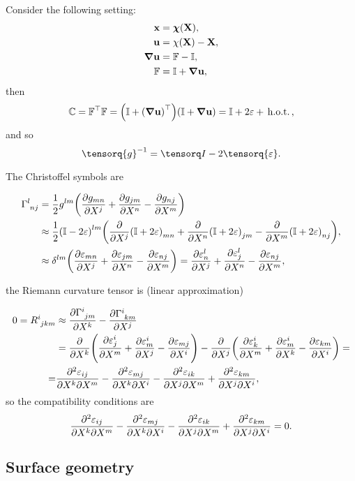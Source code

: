 \documentclass[reqno, a4paper]{article}
\begin{document}
Consider the following setting:
\begin{align*}
	\vb{x}&=\vb*{\chi}\qty(\vb{X}),\\
	\vb{u}&= \vb{\chi}\qty(\vb{X})-\vb{X},\\
	\grad \vb{u} &= \mathbb{F} - \mathbb{I}, \\
	\mathbb{F} &= \mathbb{I} + \grad \vb{u},\\
\end{align*}
then
\[
	\mathbb{C} = \mathbb{F}^\top\mathbb{F}=\qty(\mathbb{I}+\qty(\grad \vb{u})^\top)\qty(\mathbb{I}+\grad \vb{u}) = \mathbb{I} + 2 \mathbb{\varepsilon} + \, \text{h.o.t.} \,,
\]
and so
\[
	\inverse{\tensorq{g}} = \identity - 2 \tensorq{\varepsilon}.
\]

The Christoffel symbols are

\begin{align*}
	\Gamma \indices{^l_{nj}}&= \frac{1}{2}g^{lm}\qty(\pdv{g_{mn}}{X^j}+\pdv{g_{jm}}{X^n}-\pdv{g_{nj}}{X^m}) \\
				&\approx \frac{1}{2}\qty(\identity-2 \tensorq{\varepsilon})^{lm}\qty(\pdv{X^j}\qty(\identity+2 \tensorq{\varepsilon})_{mn}+\pdv{X^n}\qty(\identity+2 \varepsilon)_{jm}-\pdv{X^m}\qty(\identity+2 \varepsilon)_{nj}), \\
				&\approx \delta^{lm}\qty(\pdv{\varepsilon_{mn}}{X^j}+\pdv{\varepsilon_{jm}}{X^n}-\pdv{\varepsilon_{nj}}{X^m}) = \pdv{\varepsilon_{n}^l}{X^j}+\pdv{\varepsilon_{j}^l}{X^n}-\pdv{\varepsilon_{nj}}{X^m},
\end{align*}

the Riemann curvature tensor is (linear approximation)

\begin{align*}
0 = R \indices{^i_{jkm}}& \approx \pdv{\Gamma \indices{^i_{jm}}}{X^k}-\pdv{\Gamma \indices{^i_{km}}}{X^j}\\
			& = \pdv{X^k}\qty(\pdv{\varepsilon^i_j}{X^m}+\pdv{\varepsilon^i_m}{X^j}-\pdv{\varepsilon_{mj}}{X^i})-\pdv{X^j}\qty(\pdv{\varepsilon^i_k}{X^m}+\pdv{\varepsilon^i_m}{X^k}-\pdv{\varepsilon_{km}}{X^i}) =\\
			 =& \pdv[2]{\varepsilon_{ij}}{X^k}{X^m}-\pdv[2]{\varepsilon_{mj}}{X^k}{X^i}-\pdv[2]{\varepsilon_{ik}}{X^j}{X^m}+\pdv[2]{\varepsilon_{km}}{X^j}{X^i},
\end{align*}
so the compatibility conditions are
\[
	\pdv[2]{\varepsilon_{ij}}{X^k}{X^m}-\pdv[2]{\varepsilon_{mj}}{X^k}{X^i}-\pdv[2]{\varepsilon_{ik}}{X^j}{X^m}+\pdv[2]{\varepsilon_{km}}{X^j}{X^i} = 0.
\]

\subsection{Surface geometry}
\label{sec:surface_geometry}
\end{document}
